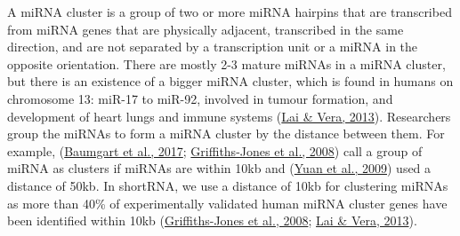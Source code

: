 \documentclass[12pt,twoside]{reedthesis}
\begin{document}
A miRNA cluster is a group of two or more miRNA hairpins that are
transcribed from miRNA genes that are physically adjacent, transcribed
in the same direction, and are not separated by a transcription unit or
a miRNA in the opposite orientation. There are mostly 2-3 mature miRNAs
in a miRNA cluster, but there is an existence of a bigger miRNA cluster,
which is found in humans on chromosome 13: miR-17 to miR-92, involved in
tumour formation, and development of heart lungs and immune systems
(\protect\hyperlink{ref-lai2013}{Lai \& Vera, 2013}). Researchers group the miRNAs to form a miRNA cluster by the
distance between them. For example, (\protect\hyperlink{ref-baumgart2017}{Baumgart et al., 2017}; \protect\hyperlink{ref-griffiths-jones2008}{Griffiths-Jones et al., 2008}) call a group of miRNA as clusters if miRNAs are within
10kb and (\protect\hyperlink{ref-yuan2009}{Yuan et al., 2009}) used a distance of 50kb. In shortRNA, we use a
distance of 10kb for clustering miRNAs as more than 40\% of
experimentally validated human miRNA cluster genes have been identified
within 10kb (\protect\hyperlink{ref-griffiths-jones2008}{Griffiths-Jones et al., 2008}; \protect\hyperlink{ref-lai2013}{Lai \& Vera, 2013}).
\end{document}
